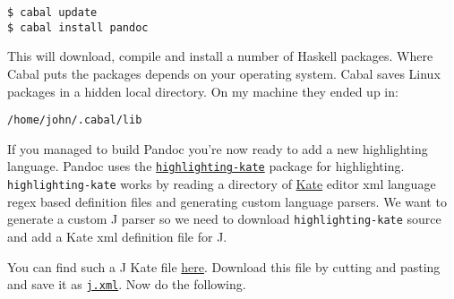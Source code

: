 \begin{tcolorbox}[breakable, size=fbox, boxrule=1pt, pad at break*=1mm,colback=cellbackground, colframe=cellborder]
\begin{verbatim}
$ cabal update
$ cabal install pandoc
\end{verbatim}
\end{tcolorbox}

This will download, compile and install a number of Haskell packages.
Where Cabal puts the packages depends on your operating system. Cabal
saves Linux packages in a hidden local directory. On my machine they
ended up in:

\begin{tcolorbox}[breakable, size=fbox, boxrule=1pt, pad at break*=1mm,colback=cellbackground, colframe=cellborder]
\begin{verbatim}
/home/john/.cabal/lib
\end{verbatim}
\end{tcolorbox}

If you managed to build Pandoc you're now ready to add a new
highlighting language. Pandoc uses the
\href{http://hackage.haskell.org/package/highlighting-kate-0.5.3.2}{\texttt{highlighting-kate}}
package for highlighting. \texttt{highlighting-kate} works by
reading a directory of \href{http://kate-editor.org/}{Kate} editor xml
language regex based definition files and generating custom language
parsers. We want to generate a custom J parser so we need to download
\texttt{highlighting-kate} source and add a Kate xml definition file for
J.

You can find such a J Kate file 
\href{https://github.com/bakerjd99/jacks/blob/master/jodliterate/j.xml}{here}.
Download this file by cutting and pasting and save it as \href{https://github.com/bakerjd99/jacks/blob/master/jodliterate/j.xml}{\texttt{j.xml}}.
Now do the following.

